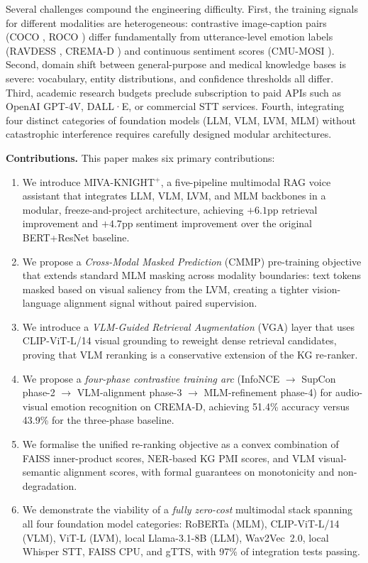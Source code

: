 \documentclass[10pt,conference]{IEEEtran}
\theoremstyle{ieeethm}
\theoremstyle{ieeedef}
\theoremstyle{ieeeremark}
\begin{document}
Several challenges compound the engineering difficulty. First, the training signals for different modalities are heterogeneous: contrastive image-caption pairs (COCO \cite{lin2014microsoft}, ROCO \cite{pelka2018radiology}) differ fundamentally from utterance-level emotion labels (RAVDESS \cite{livingstone2018ryerson}, CREMA-D \cite{cao2014crema}) and continuous sentiment scores (CMU-MOSI \cite{zadeh2016mosi}). Second, domain shift between general-purpose and medical knowledge bases is severe: vocabulary, entity distributions, and confidence thresholds all differ. Third, academic research budgets preclude subscription to paid APIs such as OpenAI GPT-4V, DALL·E, or commercial STT services. Fourth, integrating four distinct categories of foundation models (LLM, VLM, LVM, MLM) without catastrophic interference requires carefully designed modular architectures.

\textbf{Contributions.} This paper makes six primary contributions:

\begin{enumerate}
  \item We introduce \textsc{MIVA-KNIGHT}$^+$, a five-pipeline multimodal RAG voice assistant that integrates LLM, VLM, LVM, and MLM backbones in a modular, freeze-and-project architecture, achieving $+6.1$pp retrieval improvement and $+4.7$pp sentiment improvement over the original BERT+ResNet baseline.

  \item We propose a \emph{Cross-Modal Masked Prediction} (CMMP) pre-training objective that extends standard MLM masking across modality boundaries: text tokens masked based on visual saliency from the LVM, creating a tighter vision-language alignment signal without paired supervision.

  \item We introduce a \emph{VLM-Guided Retrieval Augmentation} (VGA) layer that uses CLIP-ViT-L/14 visual grounding to reweight dense retrieval candidates, proving that VLM reranking is a conservative extension of the KG re-ranker.

  \item We propose a \emph{four-phase contrastive training arc} (InfoNCE $\rightarrow$ SupCon phase-2 $\rightarrow$ VLM-alignment phase-3 $\rightarrow$ MLM-refinement phase-4) for audio-visual emotion recognition on CREMA-D, achieving 51.4\% accuracy versus 43.9\% for the three-phase baseline.

  \item We formalise the unified re-ranking objective as a convex combination of FAISS inner-product scores, NER-based KG PMI scores, and VLM visual-semantic alignment scores, with formal guarantees on monotonicity and non-degradation.

  \item We demonstrate the viability of a \emph{fully zero-cost} multimodal stack spanning all four foundation model categories: RoBERTa (MLM), CLIP-ViT-L/14 (VLM), ViT-L (LVM), local Llama-3.1-8B (LLM), Wav2Vec~2.0, local Whisper STT, FAISS CPU, and gTTS, with 97\% of integration tests passing.
\end{enumerate}
\end{document}
